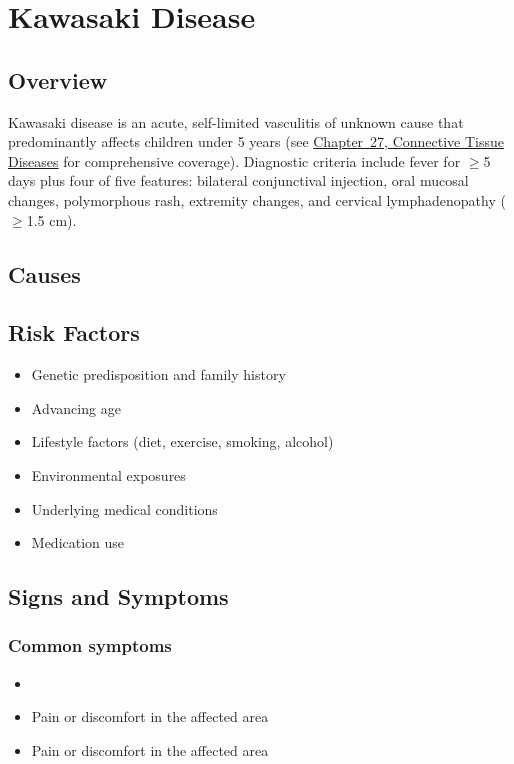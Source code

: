 \chapter{Kawasaki Disease}
\label{sec:pediatric:Kawasaki Disease}

\section{Overview}
Kawasaki disease is an acute, self-limited vasculitis of unknown cause that predominantly affects children under 5 years (see \hyperref[ch:connective_tissue]{Chapter~27, Connective Tissue Diseases} for comprehensive coverage). Diagnostic criteria include fever for $\ge$5 days plus four of five features: bilateral conjunctival injection, oral mucosal changes, polymorphous rash, extremity changes, and cervical lymphadenopathy ($\ge$1.5 cm).
\section{Causes}
\section{Risk Factors}

\begin{itemize}[noitemsep]
  \item Genetic predisposition and family history
  \item Advancing age
  \item Lifestyle factors (diet, exercise, smoking, alcohol)
  \item Environmental exposures
  \item Underlying medical conditions
  \item Medication use
\end{itemize}
\section{Signs and Symptoms}

\subsection{Common symptoms}
\begin{itemize}[noitemsep]
  \item \item Pain or discomfort in the affected area    \item Pain or discomfort in the affected area
  \end{itemize}

